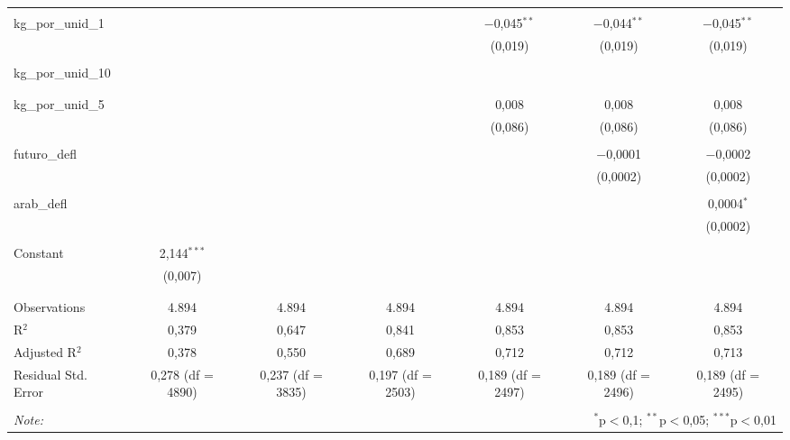 \begin{table}[!htbp]
\begin{tabular}{@{\extracolsep{5pt}}lcccccc}
  & & & & & & \\ 
 kg\_por\_unid\_1 &  &  &  & $-$0,045$^{**}$ & $-$0,044$^{**}$ & $-$0,045$^{**}$ \\ 
  &  &  &  & (0,019) & (0,019) & (0,019) \\ 
  & & & & & & \\ 
 kg\_por\_unid\_10 &  &  &  &  &  &  \\ 
  &  &  &  &  &  &  \\ 
  & & & & & & \\ 
 kg\_por\_unid\_5 &  &  &  & 0,008 & 0,008 & 0,008 \\ 
  &  &  &  & (0,086) & (0,086) & (0,086) \\ 
  & & & & & & \\ 
 futuro\_defl &  &  &  &  & $-$0,0001 & $-$0,0002 \\ 
  &  &  &  &  & (0,0002) & (0,0002) \\ 
  & & & & & & \\ 
 arab\_defl &  &  &  &  &  & 0,0004$^{*}$ \\ 
  &  &  &  &  &  & (0,0002) \\ 
  & & & & & & \\ 
 Constant & 2,144$^{***}$ &  &  &  &  &  \\ 
  & (0,007) &  &  &  &  &  \\ 
  & & & & & & \\ 
\hline \\[-1.8ex] 
Observations & 4.894 & 4.894 & 4.894 & 4.894 & 4.894 & 4.894 \\ 
R$^{2}$ & 0,379 & 0,647 & 0,841 & 0,853 & 0,853 & 0,853 \\ 
Adjusted R$^{2}$ & 0,378 & 0,550 & 0,689 & 0,712 & 0,712 & 0,713 \\ 
Residual Std. Error & 0,278 (df = 4890) & 0,237 (df = 3835) & 0,197 (df = 2503) & 0,189 (df = 2497) & 0,189 (df = 2496) & 0,189 (df = 2495) \\ 
\hline 
\hline \\[-1.8ex] 
\textit{Note:}  & \multicolumn{6}{r}{$^{*}$p$<$0,1; $^{**}$p$<$0,05; $^{***}$p$<$0,01} \\ 
\end{tabular} 
\end{table} 
